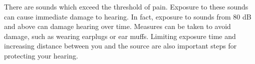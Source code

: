    \par
        \label{m38800*id185097}There are sounds which exceed the threshold
of pain. Exposure to these sounds can cause immediate damage to hearing.
In fact, exposure to sounds from
80 dB and above can damage hearing over time. Measures
can be taken to avoid damage, such as wearing earplugs
or ear muffs. Limiting exposure time and
increasing distance between you and the source are also
important steps for protecting your hearing.\par 
\label{m38800*secfhsst!!!underscore!!!id469}

